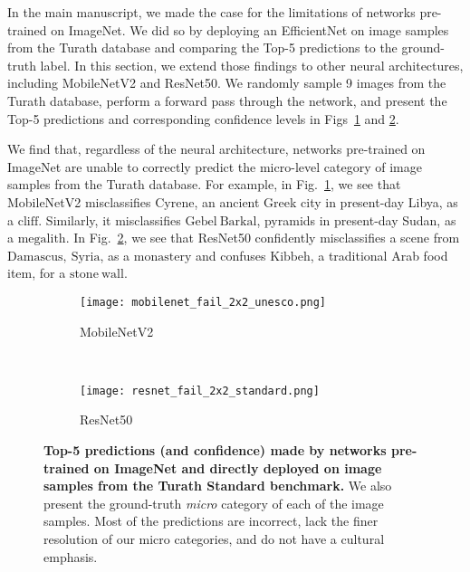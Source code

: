 \documentclass{article}
\begin{document}
In the main manuscript, we made the case for the limitations of networks pre-trained on ImageNet. We did so by deploying an EfficientNet on image samples from the Turath database and comparing the Top-5 predictions to the ground-truth label. In this section, we extend those findings to other neural architectures, including MobileNetV2 and ResNet50. We randomly sample 9 images from the Turath database, perform a forward pass through the network, and present the Top-5 predictions and corresponding confidence levels in Figs~\ref{fig:failures_standard_mobilenet} and \ref{fig:failures_standard_resnet}.  

We find that, regardless of the neural architecture, networks pre-trained on ImageNet are unable to correctly predict the micro-level category of image samples from the Turath database. For example, in Fig.~\ref{fig:failures_standard_mobilenet}, we see that MobileNetV2 misclassifies $\mathrm{Cyrene}$, an ancient Greek city in present-day Libya, as a $\mathrm{cliff}$. Similarly, it misclassifies $\mathrm{Gebel \ Barkal}$, pyramids in present-day Sudan, as a $\mathrm{megalith}$. In Fig.~\ref{fig:failures_standard_resnet}, we see that ResNet50 confidently misclassifies a scene from $\mathrm{Damascus, \ Syria}$, as a $\mathrm{monastery}$ and confuses $\mathrm{Kibbeh}$, a traditional Arab food item, for a $\mathrm{stone \ wall}$. 

\begin{figure}[!h]
    \centering
    \begin{subfigure}{\textwidth}
        \texttt{[image: mobilenet\_fail\_2x2\_unesco.png]}
        \caption{MobileNetV2}
        \label{fig:failures_standard_mobilenet}
    \end{subfigure}
    ~
    \begin{subfigure}{\textwidth}
        \texttt{[image: resnet\_fail\_2x2\_standard.png]}
        \caption{ResNet50}
        \label{fig:failures_standard_resnet}
    \end{subfigure}
    \caption{\textbf{Top-5 predictions (and confidence) made by networks pre-trained on ImageNet and directly deployed on image samples from the Turath Standard benchmark.} We also present the ground-truth \textit{micro} category of each of the image samples. Most of the predictions are incorrect, lack the finer resolution of our micro categories, and do not have a cultural emphasis.}
    \label{fig:failures_standard}
\end{figure}


\end{document}
